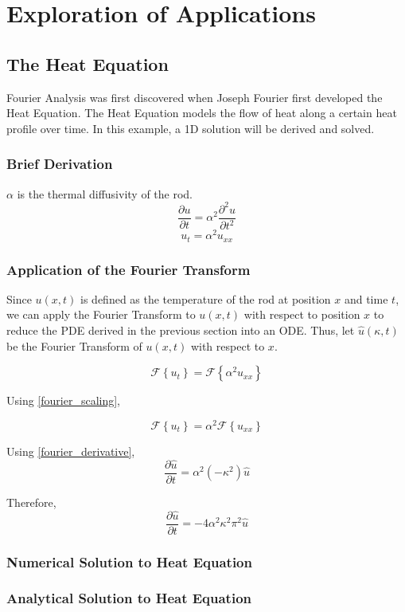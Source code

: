 \section{Exploration of Applications}
\subsection{The Heat Equation}
Fourier Analysis was first discovered when Joseph Fourier first developed the Heat Equation. The Heat Equation models the flow of heat along a certain heat profile over time. In this example, a 1D solution will be derived and solved.

\subsubsection{Brief Derivation}
\(\alpha\) is the thermal diffusivity of the rod.
\[ \frac{\partial u}{\partial t} = \alpha^2 \frac{\partial^2 u}{\partial t^2} \]
\[ u_t = \alpha^2 u_{xx} \]

\subsubsection{Application of the Fourier Transform}
Since \(u(x,t)\) is defined as the temperature of the rod at position \(x\) and time \(t\), we can apply the Fourier Transform to \(u(x,t)\) with respect to position \(x\) to reduce the PDE derived in the previous section into an ODE. Thus, let \(\hat{u}(\kappa,t)\) be the Fourier Transform of \(u(x,t)\) with respect to \(x\).

\[ \mathcal{F} \left\{ u_t \right\} = \mathcal{F} \left\{ \alpha^2 u_{xx} \right\} \]

Using \cref{fourier_scaling},

\[ \mathcal{F} \left\{ u_t \right\} = \alpha^2 \mathcal{F} \left\{ u_{xx} \right\} \]

Using \cref{fourier_derivative},
\[ \frac{\partial \hat{u}}{\partial t} = \alpha^2 \left( -\kappa^2 \right) \hat{u} \]

Therefore,
\[ \frac{\partial \hat{u}}{\partial t} = -4 \alpha^2 \kappa^2 \pi^2 \hat{u} \]

\subsubsection{Numerical Solution to Heat Equation}

\subsubsection{Analytical Solution to Heat Equation}

